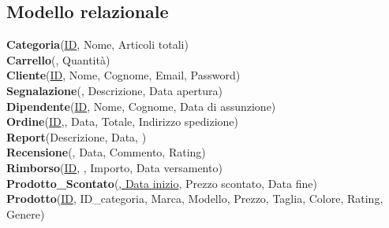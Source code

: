 \subsection{Modello relazionale}

\textbf{Categoria}(\uline{ID}, Nome, Articoli totali)\\
\textbf{Carrello}(\uline{}, Quantità)\\
\textbf{Cliente}(\uline{ID}, Nome, Cognome, Email, Password)\\
\textbf{Segnalazione}(, Descrizione, Data apertura)\\
\textbf{Dipendente}(\uline{ID}, Nome, Cognome, Data di assunzione)\\
\textbf{Ordine}(\uline{ID},, Data, Totale, Indirizzo spedizione)\\
\textbf{Report}(Descrizione, Data, \uline{})\\
\textbf{Recensione}(\uline{}, Data, Commento, Rating)\\
\textbf{Rimborso}(\uline{ID}, , Importo, Data versamento)\\
\textbf{Prodotto\_Scontato}(\uline{, Data inizio}, Prezzo scontato, Data fine)\\
\textbf{Prodotto}(\uline{ID}, ID\_categoria, Marca,  Modello, Prezzo, Taglia, Colore, Rating, Genere)\\
